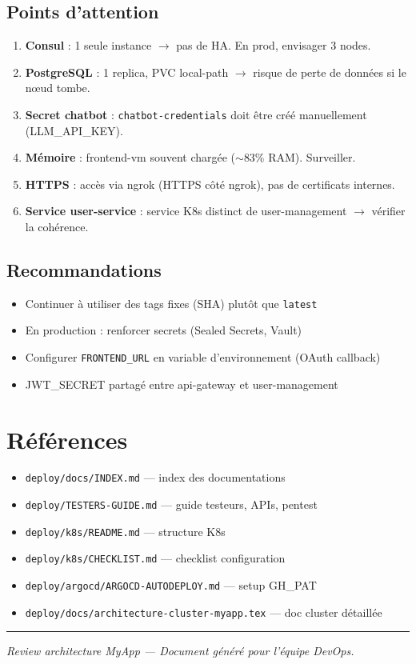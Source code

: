 \documentclass[11pt,a4paper]{article}
\begin{document}
\subsection{Points d'attention}

\begin{enumerate}
  \item \textbf{Consul} : 1 seule instance $\rightarrow$ pas de HA. En prod, envisager 3 nodes.
  \item \textbf{PostgreSQL} : 1 replica, PVC local-path $\rightarrow$ risque de perte de données si le nœud tombe.
  \item \textbf{Secret chatbot} : \texttt{chatbot-credentials} doit être créé manuellement (LLM\_API\_KEY).
  \item \textbf{Mémoire} : frontend-vm souvent chargée ($\sim$83\% RAM). Surveiller.
  \item \textbf{HTTPS} : accès via ngrok (HTTPS côté ngrok), pas de certificats internes.
  \item \textbf{Service user-service} : service K8s distinct de user-management $\rightarrow$ vérifier la cohérence.
\end{enumerate}

\subsection{Recommandations}

\begin{itemize}
  \item Continuer à utiliser des tags fixes (SHA) plutôt que \texttt{latest}
  \item En production : renforcer secrets (Sealed Secrets, Vault)
  \item Configurer \texttt{FRONTEND\_URL} en variable d'environnement (OAuth callback)
  \item JWT\_SECRET partagé entre api-gateway et user-management
\end{itemize}

\section{Références}

\begin{itemize}
  \item \texttt{deploy/docs/INDEX.md} — index des documentations
  \item \texttt{deploy/TESTERS-GUIDE.md} — guide testeurs, APIs, pentest
  \item \texttt{deploy/k8s/README.md} — structure K8s
  \item \texttt{deploy/k8s/CHECKLIST.md} — checklist configuration
  \item \texttt{deploy/argocd/ARGOCD-AUTODEPLOY.md} — setup GH\_PAT
  \item \texttt{deploy/docs/architecture-cluster-myapp.tex} — doc cluster détaillée
\end{itemize}

\vspace{1em}
\hrule
\vspace{0.5em}
\textit{Review architecture MyApp — Document généré pour l'équipe DevOps.}
\end{document}
